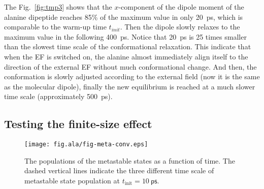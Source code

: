 \documentclass[aip,jcp,a4paper,preprint,onecolumn]{revtex4-1}
\begin{document}
The Fig.~\ref{fig:tmp3}
shows that the $x$-component of the dipole moment of the alanine dipeptide
reaches 85\% of the maximum value in only 20~ps, which is comparable to
the warm-up time $t_{init}$. Then the dipole slowly relaxes to the 
maximum value in the following 400~ps. Notice that 20~ps is 25 times
smaller than the slowest time scale of the conformational relaxation.
This indicate that when the EF is switched on, the alanine almost immediately
align itself to the
direction of the external EF without much conformational change.
And then, the conformation is slowly adjusted according to the
external field (now it is the same as the molecular dipole),
finally  the new equilibrium is reached at a much slower time scale
(approximately 500~ps).




\subsection{Testing the finite-size effect}

\begin{figure}
  \centering
  \texttt{[image: fig.ala/fig-meta-conv.eps]}
  \caption{The populations of the metastable states as a function of time.
    The dashed vertical lines indicate the three different time scale of
  metastable state population at $t_{\textrm{init}} = 10~\textsf{ps}$.}
  \label{fig:tmp7}
\end{figure}
\end{document}
